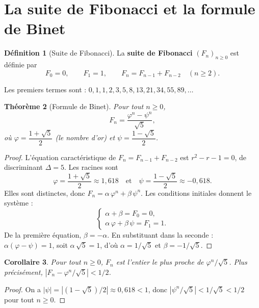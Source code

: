 \documentclass[12pt,a4paper,openany]{book}
\theoremstyle{definition}
\newtheorem{definition}{Définition}[chapter]
\theoremstyle{plain}
\newtheorem{theoreme}[definition]{Théorème}
\newtheorem{corollaire}[definition]{Corollaire}
\theoremstyle{remark}
\newcommand{\abs}[1]{\left|#1\right|}
\begin{document}
\section{La suite de Fibonacci et la formule de Binet}
\label{sec:fibonacci}

\begin{definition}[Suite de Fibonacci]
\label{def:fibonacci}
La \textbf{suite de Fibonacci} $(F_n)_{n \geq 0}$ est définie par
\[
  F_0 = 0, \qquad F_1 = 1, \qquad F_n = F_{n-1} + F_{n-2} \quad (n \geq 2).
\]
\end{definition}

Les premiers termes sont : $0, 1, 1, 2, 3, 5, 8, 13, 21, 34, 55, 89, \ldots$

\begin{theoreme}[Formule de Binet]
\label{thm:binet}
Pour tout $n \geq 0$,
\[
  F_n = \frac{\varphi^n - \psi^n}{\sqrt{5}},
\]
où $\varphi = \dfrac{1+\sqrt{5}}{2}$ (le \emph{nombre d'or})
et $\psi = \dfrac{1-\sqrt{5}}{2}$.
\end{theoreme}

\begin{proof}
L'équation caractéristique de $F_n = F_{n-1} + F_{n-2}$ est
$r^2 - r - 1 = 0$, de discriminant $\Delta = 5$. Les racines sont
\[
  \varphi = \frac{1+\sqrt{5}}{2} \approx 1{,}618 \quad \text{et} \quad
  \psi = \frac{1-\sqrt{5}}{2} \approx -0{,}618.
\]
Elles sont distinctes, donc $F_n = \alpha\, \varphi^n + \beta\, \psi^n$.
Les conditions initiales donnent le système :
\[
  \begin{cases}
    \alpha + \beta = F_0 = 0, \\
    \alpha\, \varphi + \beta\, \psi = F_1 = 1.
  \end{cases}
\]
De la première équation, $\beta = -\alpha$. En substituant dans la seconde :
$\alpha(\varphi - \psi) = 1$, soit $\alpha\, \sqrt{5} = 1$, d'où
$\alpha = 1/\sqrt{5}$ et $\beta = -1/\sqrt{5}$.
\end{proof}

\begin{corollaire}
\label{cor:fibonacci-arrondi}
Pour tout $n \geq 0$, $F_n$ est l'entier le plus proche de
$\varphi^n / \sqrt{5}$. Plus précisément, $\abs{F_n - \varphi^n/\sqrt{5}} < 1/2$.
\end{corollaire}

\begin{proof}
On a $\abs{\psi} = \abs{(1-\sqrt{5})/2} \approx 0{,}618 < 1$, donc
$\abs{\psi^n/\sqrt{5}} < 1/\sqrt{5} < 1/2$ pour tout $n \geq 0$.
\end{proof}
\end{document}
